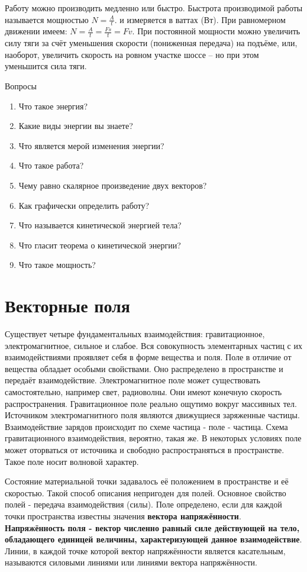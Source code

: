 \documentclass[a6paper, 11pt]{diss_4}
\renewcommand{\'}{\,'}
\begin{document}
  Работу можно производить медленно или быстро. Быстрота производимой работы
называется мощностью $N=\frac{A}{t}$. и измеряется в ваттах (Вт). При
равномерном движении имеем: $N=\frac{A}{t}=\frac{Fs}{t}=Fv$. При постоянной
мощности можно увеличить силу тяги за счёт уменьшения скорости (пониженная
передача) на подъёме, или, наоборот, увеличить скорость на ровном участке
шоссе -- но при этом уменьшится сила тяги.

\begin{center}
   Вопросы
\end{center}
\begin{enumerate}
\item Что такое энергия?
\item Какие виды энергии вы знаете?
\item Что является мерой изменения энергии?
\item Что такое работа?
\item Чему равно скалярное произведение двух векторов?
\item Как графически определить работу?
\item Что называется кинетической энергией тела?
\item Что гласит теорема о кинетической энергии?
\item Что такое мощность?
\end{enumerate}


\section{Векторные поля}

  Существует четыре фундаментальных взаимодействия: гравитационное,
электромагнитное, сильное и слабое. Вся совокупность элементарных частиц с их
взаимодействиями проявляет себя в форме вещества и поля. Поле в отличие от
вещества обладает особыми свойствами. Оно распределено в пространстве и
передаёт взаимодействие. Электромагнитное поле может существовать
самостоятельно, например свет, радиоволны. Они имеют конечную скорость
распространения. Гравитационное поле реально ощутимо вокруг массивных тел.
Источником электромагнитного поля являются движущиеся заряженные частицы.
Взаимодействие зарядов происходит по схеме частица - поле - частица. Схема
гравитационного взаимодействия, вероятно, такая же. В некоторых условиях поле
может оторваться от источника и свободно распространяться в пространстве. Такое
поле носит волновой характер.

  Состояние материальной точки задавалось её положением в пространстве и её
скоростью. Такой способ описания непригоден для полей. Основное свойство полей -
 передача взаимодействия (силы). Поле определено, если для каждой точки
пространства известны значения \textbf{вектора напряжённости}.
\textbf{Напряжённость поля - вектор численно равный силе действующей на тело,
обладающего единицей величины, характеризующей данное взаимодействие}. Линии,
в каждой точке которой вектор напряжённости является касательным, называются
силовыми линиями или линиями вектора напряжённости.
\end{document}
